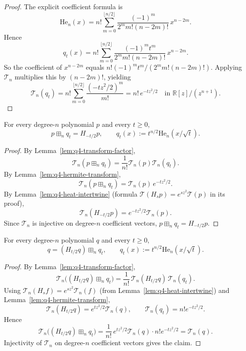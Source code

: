 \begin{proof}
The explicit coefficient formula is
\[
\mathrm{He}_n(x)=n!\sum_{m=0}^{\lfloor n/2\rfloor}
\frac{(-1)^m}{2^m m!(n-2m)!}\,x^{n-2m}.
\]
Hence
\[
q_t(x)
=n!\sum_{m=0}^{\lfloor n/2\rfloor}
\frac{(-1)^m t^m}{2^m m!(n-2m)!}\,x^{n-2m}.
\]
So the coefficient of $x^{n-2m}$ equals
$n!(-1)^m t^m/(2^m m!(n-2m)!)$.
Applying $\mathcal T_n$ multiplies this by $(n-2m)!$, yielding
\[
\mathcal T_n(q_t)
=n!\sum_{m=0}^{\lfloor n/2\rfloor}\frac{(-t z^2/2)^m}{m!}
=n!\,e^{-t z^2/2}
\quad\text{in }\mathbb R[z]/(z^{n+1}).
\]
\end{proof}

\begin{lemma}\label{lem:q4-semi-gauss-flow}
For every degree-$n$ polynomial $p$ and every $t\ge 0$,
\[
p\boxplus_n q_t = H_{-t/2}p,
\qquad q_t(x):=t^{n/2}\mathrm{He}_n(x/\sqrt t).
\]
\end{lemma}

\begin{proof}
By Lemma~\ref{lem:q4-transform-factor},
\[
\mathcal T_n(p\boxplus_n q_t)=\frac1{n!}\mathcal T_n(p)\mathcal T_n(q_t).
\]
By Lemma~\ref{lem:q4-hermite-transform},
\[
\mathcal T_n(p\boxplus_n q_t)=\mathcal T_n(p)\,e^{-t z^2/2}.
\]
By Lemma~\ref{lem:q4-heat-intertwine} (formula $\mathcal T(H_s p)=e^{s z^2}\mathcal T(p)$ in its proof),
\[
\mathcal T_n(H_{-t/2}p)=e^{-t z^2/2}\mathcal T_n(p).
\]
Since $\mathcal T_n$ is injective on degree-$n$ coefficient vectors,
$p\boxplus_n q_t=H_{-t/2}p$.
\end{proof}

\begin{lemma}\label{lem:q4-heat-deconv}
For every degree-$n$ polynomial $q$ and every $t\ge 0$,
\[
q = (H_{t/2}q)\boxplus_n q_t,
\qquad q_t(x):=t^{n/2}\mathrm{He}_n(x/\sqrt t).
\]
\end{lemma}

\begin{proof}
By Lemma~\ref{lem:q4-transform-factor},
\[
\mathcal T_n\big((H_{t/2}q)\boxplus_n q_t\big)
=
\frac1{n!}\,\mathcal T_n(H_{t/2}q)\,\mathcal T_n(q_t).
\]
Using $\mathcal T_n(H_s f)=e^{s z^2}\mathcal T_n(f)$ (from
Lemma~\ref{lem:q4-heat-intertwine}) and
Lemma~\ref{lem:q4-hermite-transform},
\[
\mathcal T_n(H_{t/2}q)=e^{t z^2/2}\mathcal T_n(q),
\qquad
\mathcal T_n(q_t)=n!e^{-t z^2/2}.
\]
Hence
\[
\mathcal T_n\big((H_{t/2}q)\boxplus_n q_t\big)
=
\frac1{n!}\,e^{t z^2/2}\mathcal T_n(q)\cdot n!e^{-t z^2/2}
=
\mathcal T_n(q).
\]
Injectivity of $\mathcal T_n$ on degree-$n$ coefficient vectors gives
the claim.
\end{proof}

